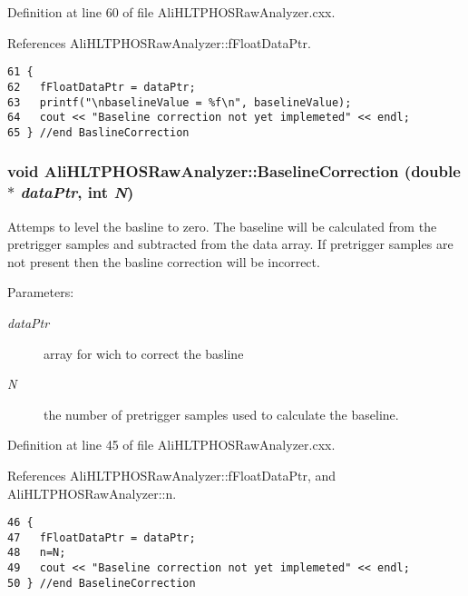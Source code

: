 Definition at line 60 of file Ali\-HLTPHOSRaw\-Analyzer.cxx.

References Ali\-HLTPHOSRaw\-Analyzer::f\-Float\-Data\-Ptr.

\footnotesize\begin{verbatim}61 {
62   fFloatDataPtr = dataPtr;   
63   printf("\nbaselineValue = %f\n", baselineValue);
64   cout << "Baseline correction not yet implemeted" << endl;
65 } //end BaslineCorrection
\end{verbatim}\normalsize 


\subsubsection{\setlength{\rightskip}{0pt plus 5cm}void Ali\-HLTPHOSRaw\-Analyzer::Baseline\-Correction (double $\ast$ {\em data\-Ptr}, int {\em N})\hspace{0.3cm}{\tt  [inherited]}}\label{classAliHLTPHOSRawAnalyzer_AliHLTPHOSRawAnalyzerPeakFindera7}


Attemps to level the basline to zero. The baseline will be calculated from the pretrigger samples and subtracted from the data array. If pretrigger samples are not present then the basline correction will be incorrect. \begin{Desc}
\item[Parameters:]
\begin{description}
\item[{\em data\-Ptr}]array for wich to correct the basline \item[{\em N}]the number of pretrigger samples used to calculate the baseline. \end{description}
\end{Desc}


Definition at line 45 of file Ali\-HLTPHOSRaw\-Analyzer.cxx.

References Ali\-HLTPHOSRaw\-Analyzer::f\-Float\-Data\-Ptr, and Ali\-HLTPHOSRaw\-Analyzer::n.

\footnotesize\begin{verbatim}46 {
47   fFloatDataPtr = dataPtr;  
48   n=N;
49   cout << "Baseline correction not yet implemeted" << endl;
50 } //end BaselineCorrection
\end{verbatim}\normalsize 


